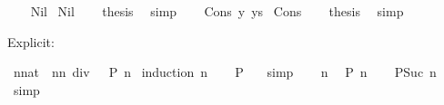 \begin{isabellebody}
\isamarkupfalse%
\isanewline
\ \ \isamarkupfalse%
\ Nil\isanewline
{}\isamarkupfalse%
\ Nil\isanewline
\ \ \isamarkupfalse%
\ {\isacharquery}{\kern0pt}thesis\ \isamarkupfalse%
\ simp\isanewline
{}\isamarkupfalse%
\isanewline
\ \ \isamarkupfalse%
\ {\isacharparenleft}{\kern0pt}Cons\ y\ ys{\isacharparenright}{\kern0pt}\isanewline
{}\isamarkupfalse%
\ Cons\isanewline
\ \ \isamarkupfalse%
\ {\isacharquery}{\kern0pt}thesis\ \isamarkupfalse%
\ simp\isanewline
{}\isamarkupfalse%
%
\endisatagproof
{\isafoldproof}%
%
\isadelimproof
%
\endisadelimproof
%
\isadelimdocument
%
\endisadelimdocument
%
\isatagdocument
%
\isamarkuptrue%
%
\endisatagdocument
{\isafolddocument}%
%
\isadelimdocument
%
\endisadelimdocument
%
\begin{isamarkuptext}%
Explicit:%
\end{isamarkuptext}\isamarkuptrue%
\isamarkupfalse%
\ {\isachardoublequoteopen}{\isasymSum}{\isacharbraceleft}{\kern0pt}{}{\isachardot}{\kern0pt}{\isachardot}{\kern0pt}n{\isacharcolon}{\kern0pt}{\isacharcolon}{\kern0pt}nat{\isacharbraceright}{\kern0pt}\ {\isacharequal}{\kern0pt}\ n{\isacharasterisk}{\kern0pt}{\isacharparenleft}{\kern0pt}n{\isacharplus}{\kern0pt}{}{\isacharparenright}{\kern0pt}\ div\ {}{\isachardoublequoteclose}\ {\isacharparenleft}{\kern0pt}\ {\isachardoublequoteopen}{\isacharquery}{\kern0pt}P\ n{\isachardoublequoteclose}{\isacharparenright}{\kern0pt}\isanewline
%
\isadelimproof
%
\endisadelimproof
%
\isatagproof
{}\isamarkupfalse%
\ {\isacharparenleft}{\kern0pt}induction\ n{\isacharparenright}{\kern0pt}\isanewline
\ \ \isamarkupfalse%
\ {\isachardoublequoteopen}{\isacharquery}{\kern0pt}P\ {}{\isachardoublequoteclose}\ \isamarkupfalse%
\ simp\isanewline
{}\isamarkupfalse%
\isanewline
\ \ \isamarkupfalse%
\ n\ \isamarkupfalse%
\ {\isachardoublequoteopen}{\isacharquery}{\kern0pt}P\ n{\isachardoublequoteclose}\isanewline
\ \ \isamarkupfalse%
\ {\isachardoublequoteopen}{\isacharquery}{\kern0pt}P{\isacharparenleft}{\kern0pt}Suc\ n{\isacharparenright}{\kern0pt}{\isachardoublequoteclose}\ \isamarkupfalse%
\ simp\isanewline
{}\isamarkupfalse%
%
\endisatagproof

\end{isabellebody}
